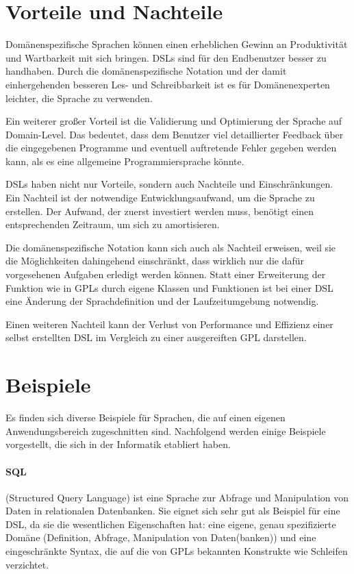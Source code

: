 \section{Vorteile und Nachteile}

Domänenspezifische Sprachen können einen erheblichen Gewinn an Produktivität und Wartbarkeit mit sich bringen\cite{VaDe98}. DSLs sind für den Endbenutzer besser zu handhaben. Durch die domänenspezifische Notation und der damit einhergehenden besseren Les- und Schreibbarkeit ist es für Domänenexperten leichter, die Sprache zu verwenden. 

Ein weiterer großer Vorteil ist die Validierung und Optimierung der Sprache auf Domain-Level. Das bedeutet, dass dem Benutzer viel detaillierter Feedback über die eingegebenen Programme und eventuell auftretende Fehler gegeben werden kann, als es eine allgemeine Programmiersprache könnte\cite{VaDe00}.

DSLs haben nicht nur Vorteile, sondern auch Nachteile und Einschränkungen. Ein Nachteil ist der not\-wen\-dige Entwicklungsaufwand, um die Sprache zu erstellen. Der Aufwand, der zuerst investiert werden muss, benötigt einen ent\-sprech\-enden Zeitraum, um sich zu amortisieren.

Die domänenspezifische Notation kann sich auch als Nachteil erweisen, weil sie die Möglichkeiten dahingehend einschränkt, dass wirklich nur die dafür vorgesehenen Aufgaben erledigt werden können. Statt einer Erweiterung der Funktion wie in GPLs durch eigene Klassen und Funktionen ist bei einer DSL eine Änderung der Sprachdefinition und der Laufzeitumgebung not\-wen\-dig.

Einen weiteren Nachteil kann der Verlust von Performance und Effizienz einer selbst erstellten DSL im Vergleich zu einer ausgereiften GPL darstellen\cite{VaDe00}.



\section{Beispiele}
\label{grundlagen_examples}

Es finden sich diverse Beispiele für Sprachen, die auf einen eigenen Anwendungsbereich zugeschnitten sind. Nachfolgend werden einige Beispiele vorgestellt, die sich in der Informatik etabliert haben.

\paragraph*{SQL}
(Structured Query Language) ist eine Sprache zur Abfrage und Manipulation von Daten in relationalen Datenbanken. Sie eignet sich sehr gut als Beispiel für eine DSL, da sie die wesentlichen Eigenschaften hat: eine eigene, genau spezifizierte Domäne (Definition, Abfrage, Manipulation von Daten(banken)) und eine eingeschränkte Syntax, die auf die von GPLs bekannten Konstrukte wie Schleifen verzichtet.

